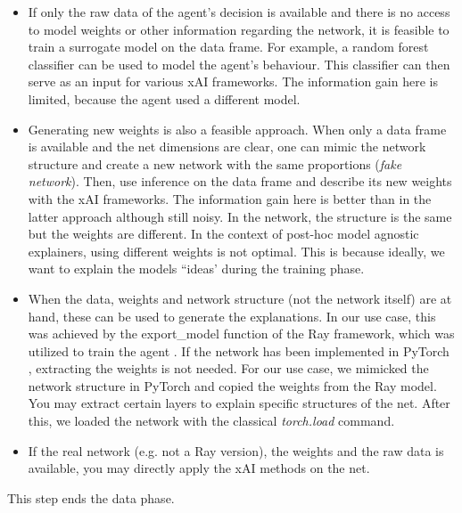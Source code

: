 \begin{itemize}
    \item If only the raw data of the agent's decision is available and there is no access to model weights or other information regarding the network, it is feasible to train a surrogate model on the data frame. For example, a random forest classifier can be used to model the agent's behaviour. This classifier can then serve as an input for various xAI frameworks. The information gain here is limited, because the agent used a different model.

    \item Generating new weights is also a feasible approach. When only a data frame is available and the net dimensions are clear, one can mimic the network structure and create a new network with the same proportions (\textit{fake network}). Then, use inference on the data frame and describe its new weights with the xAI frameworks. The information gain here is better than in the latter approach although still noisy. In the network, the structure is the same but the weights are different. In the context of post-hoc model agnostic explainers, using different weights is not optimal. This is because ideally, we want to explain the models ``ideas' during the training phase.

    \item When the data, weights and network structure (not the network itself) are at hand, these can be used to generate the explanations. In our use case, this was achieved by the export\_model function of the Ray framework, which was utilized to train the agent . If the network has been implemented in PyTorch , extracting the weights is not needed. For our use case, we mimicked the network structure in PyTorch and copied the weights from the Ray model. You may extract certain layers to explain specific structures of the net. After this, we loaded the network with the classical \textit{torch.load} command.

    \item If the real network (e.g. not a Ray version), the weights and the raw data is available, you may directly apply the xAI methods on the net.
\end{itemize}

This step ends the data phase.

